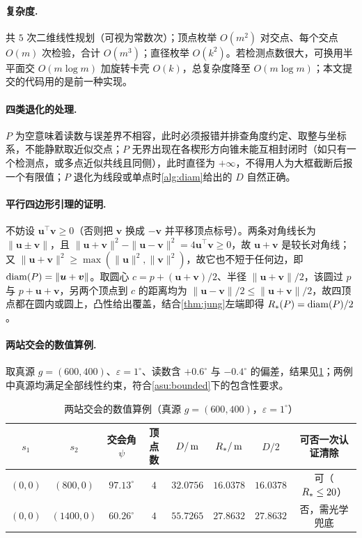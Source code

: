 \begin{appendices}
\paragraph{复杂度.} 共 $5$ 次二维线性规划（可视为常数次）；顶点枚举 $O(m^2)$ 对交点、每个交点 $O(m)$ 次检验，合计 $O(m^3)$；直径枚举 $O(k^2)$。若检测点数很大，可换用半平面交 $O(m\log m)$ 加旋转卡壳 $O(k)$，总复杂度降至 $O(m\log m)$；本文提交的代码用的是前一种实现。

\paragraph{四类退化的处理.} $P$ 为空意味着读数与误差界不相容，此时必须报错并排查角度约定、取整与坐标系，不能静默取近似交点；$P$ 无界出现在各楔形方向锥未能互相封闭时（如只有一个检测点，或多点近似共线且同侧），此时直径为 $+\infty$，不得用人为大框截断后报一个有限值；$P$ 退化为线段或单点时\cref{alg:diam}给出的 $D$ 自然正确。

\paragraph{平行四边形引理的证明.} 不妨设 $\bm u^{\!\top}\bm v\ge0$（否则把 $\bm v$ 换成 $-\bm v$ 并平移顶点标号）。两条对角线长为 $\|\bm u\pm\bm v\|$，且 $\|\bm u+\bm v\|^2-\|\bm u-\bm v\|^2=4\bm u^{\!\top}\bm v\ge0$，故 $\bm u+\bm v$ 是较长对角线；又 $\|\bm u+\bm v\|^2\ge\max(\|\bm u\|^2,\|\bm v\|^2)$，故它也不短于任何边，即 $\operatorname{diam}(P)=\|\bm u+\bm v\|$。取圆心 $c=p+(\bm u+\bm v)/2$、半径 $\|\bm u+\bm v\|/2$，该圆过 $p$ 与 $p+\bm u+\bm v$，另两个顶点到 $c$ 的距离均为 $\|\bm u-\bm v\|/2\le\|\bm u+\bm v\|/2$，故四顶点都在圆内或圆上，凸性给出覆盖，结合\cref{thm:jung}左端即得 $R_{*}(P)=\operatorname{diam}(P)/2$。

\paragraph{两站交会的数值算例.} 取真源 $g=(600,400)$、$\varepsilon=1^\circ$、读数含 $+0.6^\circ$ 与 $-0.4^\circ$ 的偏差，结果见\cref{tab:q1-example}；两例中真源均满足全部线性约束，符合\cref{asu:bounded}下的包含性要求。

\begin{table}[!htbp]
  \caption{两站交会的数值算例（真源 $g=(600,400)$，$\varepsilon=1^\circ$）}
  \label{tab:q1-example}\centering\small
  \begin{tabular}{cccccccc}
    \toprule[1.5pt]
    $s_1$ & $s_2$ & 交会角 $\psi$ & 顶点数 & $D/\,\mathrm{m}$ & $R_{*}/\,\mathrm{m}$ & $D/2$ & 可否一次认证清除 \\
    \midrule[1pt]
    $(0,0)$ & $(800,0)$  & $97.13^\circ$ & $4$ & $32.0756$ & $16.0378$ & $16.0378$ & 可（$R_{*}\le20$） \\
    $(0,0)$ & $(1400,0)$ & $60.26^\circ$ & $4$ & $55.7265$ & $27.8632$ & $27.8632$ & 否，需光学兜底 \\
    \bottomrule[1.5pt]
  \end{tabular}
\end{table}


\end{appendices}
